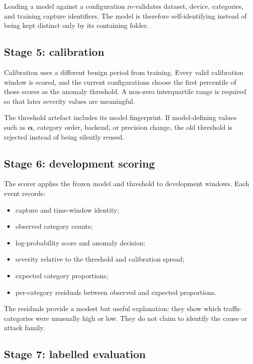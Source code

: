 \documentclass[11pt,a4paper]{article}
\begin{document}
Loading a model against a configuration re-validates dataset, device, categories, and training capture identifiers. The model is therefore self-identifying instead of being kept distinct only by its containing folder.

\subsection{Stage 5: calibration}

Calibration uses a different benign period from training. Every valid calibration window is scored, and the current configurations choose the first percentile of those scores as the anomaly threshold. A non-zero interquartile range is required so that later severity values are meaningful.

The threshold artefact includes its model fingerprint. If model-defining values such as $\boldsymbol{\alpha}$, category order, backend, or precision change, the old threshold is rejected instead of being silently reused.

\subsection{Stage 6: development scoring}

The scorer applies the frozen model and threshold to development windows. Each event records:

\begin{itemize}
  \item capture and time-window identity;
  \item observed category counts;
  \item log-probability score and anomaly decision;
  \item severity relative to the threshold and calibration spread;
  \item expected category proportions;
  \item per-category residuals between observed and expected proportions.
\end{itemize}

The residuals provide a modest but useful explanation: they show which traffic categories were unusually high or low. They do not claim to identify the cause or attack family.

\subsection{Stage 7: labelled evaluation}
\end{document}
